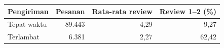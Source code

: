 \begin{tabular}{lrrr}
\toprule
Pengiriman & Pesanan & Rata-rata review & Review 1--2 (\%) \\
\midrule
Tepat waktu & 89.443 & 4,29 & 9,27 \\
Terlambat & 6.381 & 2,27 & 62,42 \\
\bottomrule
\end{tabular}

